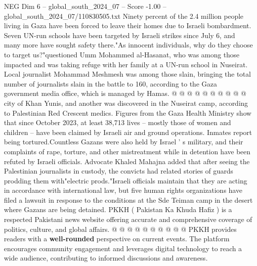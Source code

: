 \begin{textsample}{NEG Dim 6 – global\_south\_2024\_07 – Score -1.00 – global\_south\_2024\_07/110830505.txt}
Ninety percent of the 2.4 million people living in Gaza have been forced to leave their homes due to Israeli bombardment.
Seven UN-run schools have been targeted by Israeli strikes since July 6, and many more have sought safety there."As innocent individuals, why do they choose to target us?"questioned Umm Mohammed al-Hasanat, who was among those impacted and was taking refuge with her family at a UN-run school in Nuseirat.
Local journalist Mohammad Meshmesh was among those slain, bringing the total number of journalists slain in the battle to 160, according to the Gaza government media office, which is managed by Hamas. @ @ @ @ @ @ @ @ @ @ city of Khan Yunis, and another was discovered in the Nuseirat camp, according to Palestinian Red Crescent medics.
Figures from the Gaza Health Ministry show that since October 2023, at least 38,713 lives -- mostly those of women and children -- have been claimed by Israeli air and ground operations.
Inmates report being tortured.Countless Gazans were also held by Israel ' s military, and their complaints of rape, torture, and other mistreatment while in detention have been refuted by Israeli officials.
Advocate Khaled Mahajna added that after seeing the Palestinian journalists in custody, the convicts had related stories of guards prodding them with"electric prods."Israeli officials maintain that they are acting in accordance with international law, but five human rights organizations have filed a lawsuit in response to the conditions at the Sde Teiman camp in the desert where Gazans are being detained.
PKKH ( Pakistan Ka Khuda Hafiz ) is a respected Pakistani news website offering accurate and comprehensive coverage of politics, culture, and global affairs. @ @ @ @ @ @ @ @ @ @ PKKH provides readers with a \textbf{well-rounded} perspective on current events.
The platform encourages community engagement and leverages digital technology to reach a wide audience, contributing to informed discussions and awareness.

\end{textsample}
